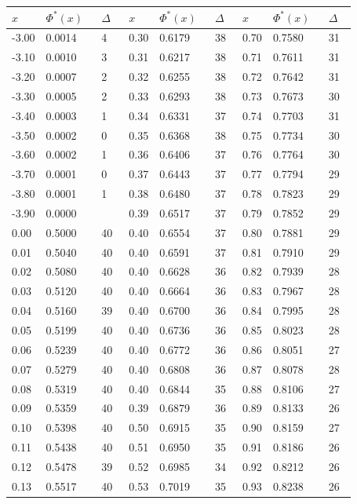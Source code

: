 \documentclass[russian, 12pt, fleqn]{article}
\begin{document}
\begin{center}
\begin{tabular}[b]{ | l | l |  l || l | l | l || l | l | l |   }
\hline
$x\ \ \ \ \ $&$\Phi^*(x)\ \ \ $&$\Delta\ \ \ $&$x\ \ \ \ \ $&$\Phi^*(x)\ \ \ $&$\Delta\ \ \ $&$x\ \ \ \ \ $&$\Phi^*(x)\ \ \ $&$\Delta\ \ \ $\\
\hline
-3.00&0.0014&4&0.30&0.6179&38&0.70&0.7580&31\\%
-3.10&0.0010&3&0.31&0.6217&38&0.71&0.7611&31\\%
-3.20&0.0007&2&0.32&0.6255&38&0.72&0.7642&31\\%
-3.30&0.0005&2&0.33&0.6293&38&0.73&0.7673&30\\%
-3.40&0.0003&1&0.34&0.6331&37&0.74&0.7703&31\\%
 
-3.50&0.0002&0&0.35&0.6368&38&0.75&0.7734&30\\%
-3.60&0.0002&1&0.36&0.6406&37&0.76&0.7764&30\\%
-3.70&0.0001&0&0.37&0.6443&37&0.77&0.7794&29\\%
-3.80&0.0001&1&0.38&0.6480&37&0.78&0.7823&29\\%
-3.90&0.0000&  &0.39&0.6517&37&0.79&0.7852&29\\%
0.00&0.5000&40&0.40&0.6554&37&0.80&0.7881&29\\%
0.01&0.5040&40&0.40&0.6591&37&0.81&0.7910&29\\%
0.02&0.5080&40&0.40&0.6628&36&0.82&0.7939&28\\%
0.03&0.5120&40&0.40&0.6664&36&0.83&0.7967&28\\%
0.04&0.5160&39&0.40&0.6700&36&0.84&0.7995&28\\%
0.05&0.5199&40&0.40&0.6736&36&0.85&0.8023&28\\%
0.06&0.5239&40&0.40&0.6772&36&0.86&0.8051&27\\%
0.07&0.5279&40&0.40&0.6808&36&0.87&0.8078&28\\%
0.08&0.5319&40&0.40&0.6844&35&0.88&0.8106&27\\%
0.09&0.5359&40&0.39&0.6879&36&0.89&0.8133&26\\%
0.10&0.5398&40&0.50&0.6915&35&0.90&0.8159&27\\%
0.11&0.5438&40&0.51&0.6950&35&0.91&0.8186&26\\%
0.12&0.5478&39&0.52&0.6985&34&0.92&0.8212&26\\%
0.13&0.5517&40&0.53&0.7019&35&0.93&0.8238&26\\%

\end{tabular}
\end{center}
\end{document}
